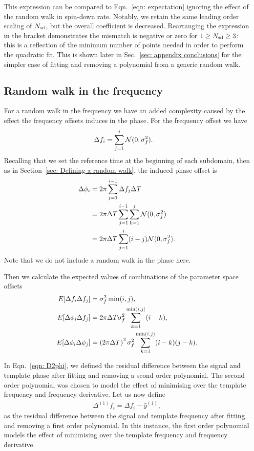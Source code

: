 \documentclass[../full_thesis/full_thesis.tex]{subfiles}
\begin{document}
This expression can be compared to Eqn.~\eqref{eqn: expectation} ignoring the
effect of the random walk in spin-down rate. Notably, we retain the same
leading order scaling of $N_{\textrm{sd}}$, but the overall coefficient is decreased.
Rearranging the expression in the bracket demonstrates the mismatch is negative
or zero for $1 \ge N_{\textrm{sd}} \ge 3$: this is a reflection of the minimum number of
points needed in order to perform the quadratic fit. This is shown later in
Sec.~\ref{sec: appendix conclusions} for the simpler case of fitting and
removing a polynomial from a generic random walk.

\subsection{Random walk in the frequency}

For a random walk in the frequency we have an added complexity caused by the
effect the frequency offsets induces in the phase. For the frequency offset we
have
\begin{align}
\Delta f_{i} &= \sum_{j=1}^{i}\mathcal{N}(0, \sigma_{f}^{2}).
\end{align}
Recalling that we set the reference time at the beginning of each subdomain,
then as in Section~\ref{sec: Defining a random walk}, the induced phase offset is
\begin{align}
\Delta\phi_{i} &=2\pi \sum_{j=1}^{i-1}\Delta f_{j}\Delta T \\
 & = 2\pi\Delta T \sum_{j=1}^{i-1}\sum_{k=1}^{j}\mathcal{N}(0, \sigma_{f}^{2}) \\
& = 2\pi\Delta T \sum_{j=1}^{i}(i-j)\mathcal{N}(0, \sigma_{f}^{2}).
\label{eqn: P2F}
\end{align}
Note that we do not include a random walk in the phase here.

Then we calculate the expected values of combinations of the parameter space
offsets
\begin{align}
E[\Delta f_{i}\Delta f_{j}] & = \sigma_{f}^{2} \min(i, j), \label{eqn: E1} \\
E[\Delta\phi_{i}\Delta f_{j}] & = 2 \pi \Delta T \sigma_{f}^{2} \sum_{k=1}^{\min(i, j)}(i-k), \label{eqn: E2}\\
E[\Delta\phi_{i}\Delta\phi_{j}] & =
\left(2\pi\Delta T\right)^{2}\sigma_{f}^{2} \sum_{k=1}^{\min(i, j)}(i-k)(j-k).
\label{eqn: E3}
\end{align}

In Eqn.~\eqref{eqn: D2phi}, we defined the residual difference between the signal
and template phase after fitting and removing a scond order polynomial. The
second order polynomial was chosen to model the effect of minimising over the
template frequency and frequency derivative. Let us now define
\begin{align}
\Delta^{(1)}f_i = \Delta f_i - \hat{y}^{(1)},
\label{eqn: D2f}
\end{align}
as the residual difference between the signal and template frequency after
fitting and removing a first order polynomial. In this instance, the first
order polynomial models the effect of minimising over the template
frequency and frequency derivative.
\end{document}
